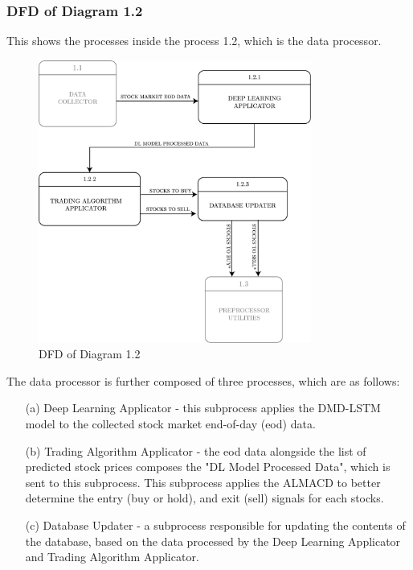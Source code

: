 \subsubsection{DFD of Diagram 1.2}
\label{subsubsec: dfd1.2}
This shows the processes inside the process 1.2, which is the data processor.
\begin{figure}[ht]
    \centering
    \includegraphics[width=0.80\textwidth]{./assets/Chapter_3/DFD/DFD_1.2.png}
    \caption{DFD of Diagram 1.2}
    \label{fig:dfd1.2}
\end{figure}
\FloatBarrier

The data processor is further composed of three processes, which are as follows:
\begin{itemize}
    \item[(a)] Deep Learning Applicator - this subprocess applies the DMD-LSTM model to 
    the collected stock market end-of-day (eod) data.
    \item[(b)] Trading Algorithm Applicator - the eod data alongside the list of predicted stock prices
    composes the "DL Model Processed Data", which is sent to this subprocess. This subprocess applies
    the ALMACD to better determine the entry (buy or hold), and exit (sell) signals for each stocks.
    \item[(c)] Database Updater - a subprocess responsible for updating the contents of the database, 
    based on the data processed by the Deep Learning Applicator and Trading Algorithm Applicator.
\end{itemize}


